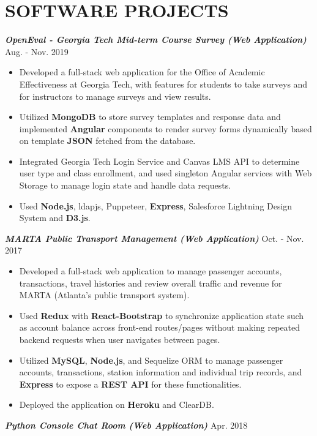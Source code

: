 \documentclass[10pt]{article}
\begin{document}
\section*{SOFTWARE PROJECTS}
\textbf{\itshape OpenEval - Georgia Tech Mid-term Course Survey (Web Application)}  \hfill {Aug. - Nov. 2019}
\begin{itemize}[leftmargin=15pt, noitemsep, topsep=0pt]
\item Developed a full-stack web application for the Office of Academic Effectiveness at Georgia Tech, with features for students to take surveys and for instructors to manage surveys and view results.
\item Utilized \textbf{MongoDB} to store survey templates and response data and implemented \textbf{Angular} components to render survey forms dynamically based on template \textbf{JSON} fetched from the database.
\item Integrated Georgia Tech Login Service and Canvas LMS API to determine user type and class enrollment, and used singleton Angular services with Web Storage to manage login state and handle data requests.
\item Used \textbf{Node.js}, ldapjs, Puppeteer, \textbf{Express}, Salesforce Lightning Design System and \textbf{D3.js}.
\end{itemize}
\vspace{0.5em}
%
\textbf{\itshape MARTA Public Transport Management (Web Application)} \hfill {Oct. - Nov. 2017}
\begin{itemize}[leftmargin=15pt, noitemsep, topsep=0pt]
\item Developed a full-stack web application to manage passenger accounts, transactions, travel histories and review overall traffic and revenue for MARTA (Atlanta's public transport system).
\item Used \textbf{Redux} with \textbf{React-Bootstrap} to synchronize application state such as account balance across front-end routes/pages without making repeated backend requests when user navigates between pages. 
\item Utilized \textbf{MySQL}, \textbf{Node.js}, and Sequelize ORM to manage passenger accounts, transactions, station information and individual trip records, and \textbf{Express} to expose a \textbf{REST API}  for these functionalities.
\item Deployed the application on \textbf{Heroku} and ClearDB.
\end{itemize}
\vspace{0.5em}
%
\textbf{\itshape Python Console Chat Room (Web Application)}  \hfill {Apr. 2018}
\end{document}
